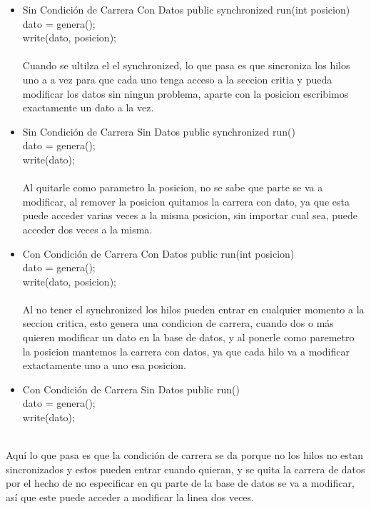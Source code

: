 \documentclass[12pt, letterpaper]{article}
\begin{document}
\begin{itemize}
\begin{itemize}
\item Sin Condición de Carrera Con Datos
public synchronized run(int posicion) \\
dato = genera();\\
write(dato, posicion);\\
\\
Cuando se ultilza el el synchronized, lo que pasa es que sincroniza los hilos uno a a vez para que cada uno tenga acceso a la seccion critia y pueda modificar los datos sin ningun problema, aparte con la posicion escribimos exactamente un dato a la vez. \\

\item Sin Condición de Carrera Sin Datos
public synchronized run() \\
dato = genera();\\
write(dato);\\
\\
Al quitarle como parametro la posicion, no se sabe que parte se va a  modificar, al remover la posicion quitamos la carrera con dato, ya que esta puede acceder varias veces a la misma posicion, sin importar cual sea, puede acceder dos veces a la misma. 

\item Con Condición de Carrera Con Datos
public run(int posicion) \\
dato = genera();\\
write(dato, posicion);\\
\\
Al no tener el synchronized los hilos pueden entrar en cualquier momento a la seccion critica, esto genera una condicion de carrera, cuando dos o más quieren modificar un dato en la base de datos, y al ponerle como paremetro la posicion mantemos la carrera con datos, ya que cada hilo va a modificar extactamente uno a uno esa posicion. 

\item Con Condición de Carrera Sin Datos
public run() \\
dato = genera();\\
write(dato);\\
\\
\end{itemize}
Aquí lo que pasa es que la condición de carrera se da porque no los hilos no estan sincronizados y estos pueden entrar cuando quieran, y se quita la carrera de datos por el hecho de no especificar en qu parte de la base de datos se va a modificar, así que este puede acceder a modificar la linea dos veces.






\end{itemize}
\end{document}
